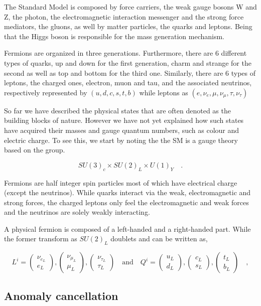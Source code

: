 { \color{red}
The Standard Model is composed by force carriers, the weak gauge bosons W and Z, the photon, the electromagnetic interaction messenger and the strong force mediators, the gluons, as well by matter particles, the quarks and leptons. Being that the Higgs boson is responsible for the mass generation mechanism.

Fermions are organized in three generations. Furthermore, there are 6 different types of quarks, up and down for the first generation, charm and strange for the second as well as top and bottom for the third one. Similarly, there are 6 types of leptons, the charged ones, electron, muon and tau, and the associated neutrinos, respectively represented by $(u,d,c,s,t,b)$ while leptons as $(e,\nu_{e},\mu,\nu_{\mu},\tau,\nu_{\tau})$

So far we have described the physical states that are often denoted as the building blocks of nature. However we have not yet explained how such states have acquired their masses and gauge quantum numbers, such as colour and electric charge. To see this, we start by noting the the SM is a gauge theory based on the group.

\begin{equation}
SU(3)_c \times SU(2)_L \times U(1)_Y \quad  .
\label{SMsymmetry}
\end{equation} 

Fermions are half integer spin particles most of which have electrical charge (except the neutrinos).  While quarks interact via the weak, electromagnetic and strong forces, the charged leptons only feel the electromagnetic and weak forces and the neutrinos are solely weakly interacting.  

A physical fermion is composed of a left-handed and a right-handed part. While the former transform as $SU(2)_L$ doublets and can be written as,

\begin{equation}
L^i= \begin{pmatrix}
\nu_{e_L} \\ e_L 
\end{pmatrix},
\begin{pmatrix}
\nu_{\mu_L} \\ \mu_L 
\end{pmatrix},
\begin{pmatrix}
\nu_{\tau_L} \\ \tau_L 
\end{pmatrix} 
\quad 
\text{and} \quad Q^i= \begin{pmatrix}
u_{L} \\
d_L 
\end{pmatrix},\begin{pmatrix}
c_{L} \\
s_L 
\end{pmatrix}
,\begin{pmatrix}
t_{L} \\
b_L 
\end{pmatrix} \quad ,
\end{equation}

}

\subsection{Anomaly cancellation}



